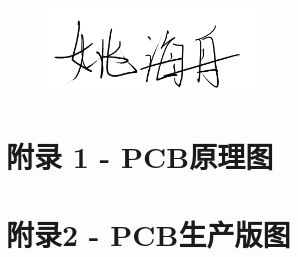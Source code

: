 \documentclass[a4paper]{ctexart}
\begin{document}
\begin{figure}[b]
	\flushright
	\includegraphics[width=0.5\textwidth]{signature.png}
\end{figure} 


\begin{appendices}
		\setlength{\baselineskip}{8pt}
	\section{附录 1 - PCB原理图}
		
		\begin{figure}[H]
			\centering
			\hspace{-10mm}
			\setlength{\leftskip}{-42.5pt}
			
		\end{figure}
	
	
	\section{附录2 - PCB生产版图}
	

\end{appendices}
\end{document}
